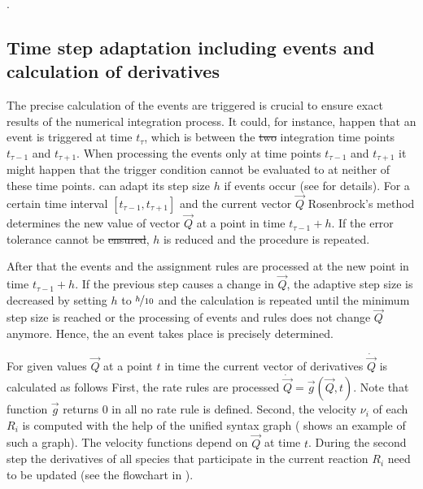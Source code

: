 \documentclass[10pt]{bmc_article}
\newenvironment{bmcformat}{\fussy\setboolean{publ}{true}}{\fussy}
\begin{document}
\begin{bmcformat}
.

\subsection*{Time step adaptation including events and calculation of derivatives}
The precise calculation of the  events are triggered is crucial
to ensure exact results of the numerical integration process.
It could, for instance, happen that an event is triggered at time $t_{\tau}$,
which is between the \sout{two} integration time points $t_{\tau - 1}$ and $t_{\tau + 1}$.
When processing the events only at time points $t_{\tau - 1}$ and $t_{\tau + 1}$\COR{,}
it might happen that the trigger condition cannot be evaluated to \true at
neither of these time points.
 \cite{Press1993} can adapt its step size $h$ if events
occur (see  for details).
For a certain time interval $[t_{\tau - 1}, t_{\tau + 1}]$ and the current vector
$\vec{Q}$\COR{,} Rosenbrock's method determines the new value of vector $\vec{Q}$ at a
point in time $t_{\tau - 1} + h$.
If the error tolerance cannot be \sout{ensured},
$h$ is reduced and the procedure is repeated.

After that\COR{,} the events and the assignment rules are processed at the new
point in time $t_{\tau - 1} + h$.
If the previous step causes a change in $\vec{Q}$, the adaptive step size is
decreased by setting $h$ to $\nicefrac{h}{10}$ and the calculation is repeated
until  the minimum step size is reached or the processing of events
and  rules does not change $\vec{Q}$ anymore.
Hence, the  an event takes place is precisely determined.

For given values $\vec{Q}$ at a point $t$ in time the current vector of
derivatives $\dot{\vec{Q}}$ is calculated as follows
First, the rate rules are processed $\dot{\vec{Q}} = \vec{g}(\vec{Q}, t)$.
Note that function $\vec{g}$ returns 0 in all  no rate rule is defined.
Second, the velocity $\nu_i$ of each  $R_i$ is computed
with the help of the unified syntax graph ( shows an example of
such a graph).
The velocity functions depend on $\vec{Q}$ at time $t$.
During the second step\COR{,} the derivatives of all species that participate in
the current reaction $R_i$ need to be updated (see the flowchart in
).


\end{bmcformat}
\end{document}
